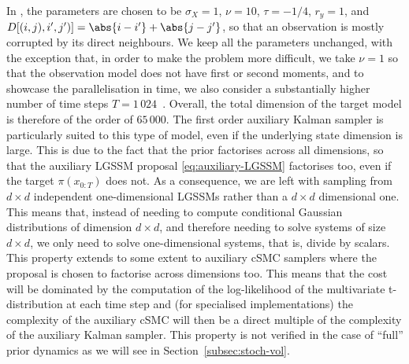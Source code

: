 In \citet{cruscino2022highdim}, the parameters are chosen to be $\sigma_X = 1$, $\nu = 10$, $\tau = -1/4$, $r_y = 1$, and $D[(i, j), i', j')] = \abs{i - i'} + \abs{j - j'}$, so that an observation is mostly corrupted by its direct neighbours. We keep all the parameters unchanged, with the exception that, in order to make the problem more difficult, we take $\nu=1$ so that the observation model does not have first or second moments, and to showcase the parallelisation in time, we also consider a substantially higher number of time steps $T=1\,024$~\citep[vs. $T=10$ in][]{cruscino2022highdim}. Overall, the total dimension of the target model is therefore of the order of $65\,000$.
The first order auxiliary Kalman sampler is particularly suited to this type of model, even if the underlying state dimension is large. This is due to the fact that the prior factorises across all dimensions, so that the auxiliary LGSSM proposal \eqref{eq:auxiliary-LGSSM} factorises too, even if the target $\pi(x_{0:T})$ does not. As a consequence, we are left with sampling from $d \times d$ independent one-dimensional LGSSMs rather than a $d\times d$ dimensional one. This means that, instead of needing to compute conditional Gaussian distributions of dimension $d \times d$, and therefore needing to solve systems of size $d \times d$, we only need to solve one-dimensional systems, that is, divide by scalars. This property extends to some extent to auxiliary cSMC samplers where the proposal is chosen to factorise across dimensions too. This means that the cost will be dominated by the computation of the log-likelihood of the multivariate t-distribution at each time step and (for specialised implementations) the complexity of the auxiliary cSMC will then be a direct multiple of the complexity of the auxiliary Kalman sampler. This property is not verified in the case of ``full'' prior dynamics as we will see in Section~\ref{subsec:stoch-vol}.

